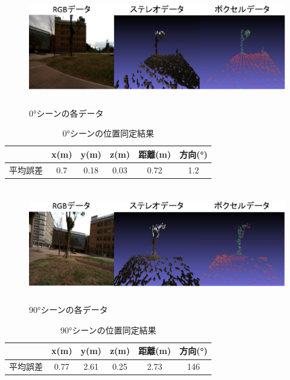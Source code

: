 \begin{figure}[htbp]
  \begin{center}
   \includegraphics[height=50mm]{figure/0°シーンの各データ.eps}
   \caption{0°シーンの各データ}
   \label{0°シーンの各データ}
  \end{center}
\end{figure}
%
\begin{table}[htbp]
\begin{center}
\begin{tabular}{|c|c|c|c|c|c|} \hline
\  & x(m) & y(m) & z(m) & 距離(m) & 方向(°)\\ \hline
平均誤差 & 0.7 & 0.18 & 0.03 & 0.72 & 1.2\\ \hline
\end{tabular}
\caption{0°シーンの位置同定結果}
\end{center}
\end{table}
%

\begin{figure}[htbp]
  \begin{center}
   \includegraphics[height=50mm]{figure/90°シーンの各データ.eps}
   \caption{90°シーンの各データ}
   \label{90°シーンの各データ}
  \end{center}
\end{figure}
%
\begin{table}[htbp]
\begin{center}
\begin{tabular}{|c|c|c|c|c|c|} \hline
\  & x(m) & y(m) & z(m) & 距離(m) & 方向(°)\\ \hline
平均誤差 & 0.77 & 2.61 & 0.25 & 2.73 & 146\\ \hline
\end{tabular}
\caption{90°シーンの位置同定結果}
\end{center}
\end{table}
%

